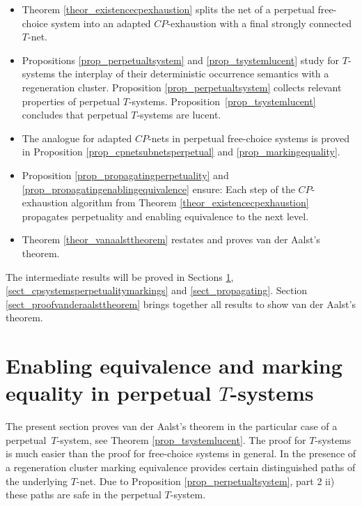 \documentclass{fundam}
\begin{document}
\begin{itemize}
\item Theorem \ref{theor_existencecpexhaustion}	splits the net of a perpetual free-choice system into an adapted $CP$-exhaustion with a final
strongly connected $T$-net.

\item Propositions \ref{prop_perpetualtsystem} and \ref{prop_tsystemlucent} study for $T$-systems the interplay of their deterministic occurrence semantics with a regeneration cluster. Proposition \ref{prop_perpetualtsystem} collects relevant properties of  perpetual $T$-systems.
    Proposition~\ref{prop_tsystemlucent} concludes that perpetual $T$-systems are lucent.

\item The analogue for adapted $CP$-nets in perpetual free-choice systems is proved in Proposition \ref{prop_cpnetsubnetsperpetual} and \ref{prop_markingequality}.

\item Proposition \ref{prop_propagatingperpetuality} and \ref{prop_propagatingenablingequivalence} ensure: Each step of the $CP$-exhaustion algorithm from
Theorem \ref{theor_existencecpexhaustion} propagates perpetuality and enabling equivalence to the next level.

\item Theorem \ref{theor_vanaalsttheorem} restates and proves van der Aalst's theorem.
\end{itemize}
\noindent
The intermediate results will be proved in Sections \ref{sect_tsystemsperpetualitymarkings}, \ref{sect_cpsystemsperpetualitymarkings} and \ref{sect_propagating}. Section \ref{sect_proofvanderaalsttheorem} brings together all results to show van der Aalst's theorem.


\section{Enabling equivalence and marking equality in perpetual $T$-systems}\label{sect_tsystemsperpetualitymarkings}

The present section proves van der Aalst's theorem in the particular case of a \mbox{perpetual $T$-system}, see Theorem \ref{prop_tsystemlucent}. The proof for $T$-systems is much easier than the proof for free-choice systems in general. In the presence of a regeneration cluster marking equivalence provides certain distinguished paths of the underlying $T$-net. Due to Proposition \ref{prop_perpetualtsystem}, part 2 ii) these paths are safe in the perpetual $T$-system.
\end{document}
